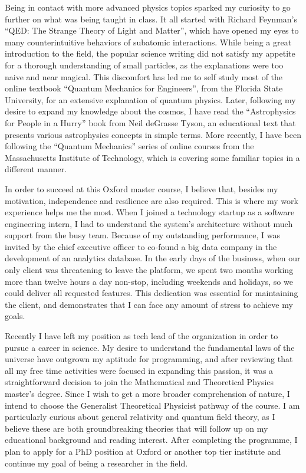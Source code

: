 \documentclass[11pt]{article}
\newcommand*{\NEWLINE}{\vspace{0.75em}}
\begin{document}
Being in contact with more advanced physics topics sparked my curiosity to go further on what was being taught in class. It all started with Richard Feynman's ``QED: The Strange Theory of Light and Matter'', which have opened my eyes to many counterintuitive behaviors of subatomic interactions. While being a great introduction to the field, the popular science writing did not satisfy my appetite for a thorough understanding of small particles, as the explanations were too naive and near magical. This discomfort has led me to self study most of the online textbook ``Quantum Mechanics for Engineers'', from the Florida State University, for an extensive explanation of quantum physics. Later, following my desire to expand my knowledge about the cosmos, I have read the ``Astrophysics for People in a Hurry'' book from Neil deGrasse Tyson, an educational text that presents various astrophysics concepts in simple terms. More recently, I have been following the ``Quantum Mechanics'' series of online courses from the Massachusetts Institute of Technology, which is covering some familiar topics in a different manner.
\NEWLINE{}

In order to succeed at this Oxford master course, I believe that, besides my motivation, independence and resilience are also required. This is where my work experience helps me the most. When I joined a technology startup as a software engineering intern, I had to understand the system's architecture without much support from the busy team. Because of my outstanding performance, I was invited by the chief executive officer to co-found a big data company in the development of an analytics database. In the early days of the business, when our only client was threatening to leave the platform, we spent two months working more than twelve hours a day non-stop, including weekends and holidays, so we could deliver all requested features. This dedication was essential for maintaining the client, and demonstrates that I can face any amount of stress to achieve my goals. \NEWLINE{}

Recently I have left my position as tech lead of the organization in order to pursue a career in science. My desire to understand the fundamental laws of the universe have outgrown my aptitude for programming, and after reviewing that all my free time activities were focused in expanding this passion, it was a straightforward decision to join the Mathematical and Theoretical Physics master's degree. Since I wish to get a more broader comprehension of nature, I intend to choose the Generalist Theoretical Physicist pathway of the course. I am particularly curious about general relativity and quantum field theory, as I believe these are both groundbreaking theories that will follow up on my educational background and reading interest. After completing the programme, I plan to apply for a PhD position at Oxford or another top tier institute and continue my goal of being a researcher in the field.
\end{document}
